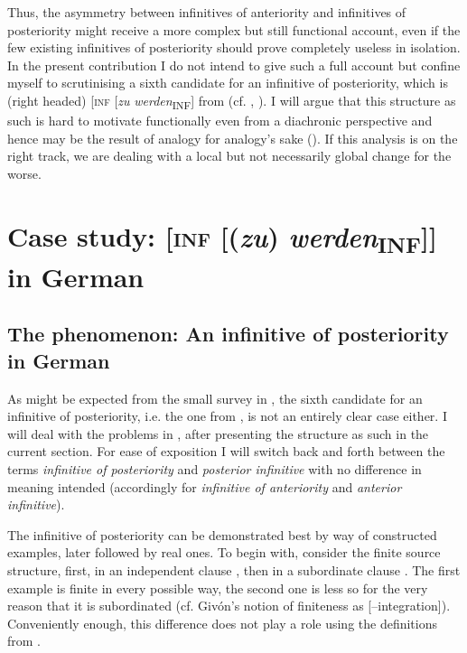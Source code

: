 \documentclass[output=paper,hidelinks]{langscibook}
\begin{document}
Thus, the asymmetry between infinitives of anteriority and infinitives of posteriority might receive a more complex but still functional account, even if the few existing infinitives of posteriority should prove completely useless in isolation. In the present contribution I do not intend to give such a full account but confine myself to scrutinising a sixth candidate for an infinitive of posteriority, which is (right headed) [\textsc{inf} [\emph{zu} \textit{werden}\textsubscript{INF}] from  (cf. , ). I will argue that this structure as such is hard to motivate functionally even from a diachronic perspective and hence may be the result of analogy for analogy’s sake (). If this analysis is on the right track, we are dealing with a local but not necessarily global change for the worse.

\section{Case study: [\textsc{inf} [(\emph{zu}) \textit{werden}\textsubscript{INF}]] in German}\label{sec:reiner:2}

\subsection{The phenomenon: An infinitive of posteriority in German}\label{sec:reiner:2.1}\largerpage[2]

As might be expected from the small survey in , the sixth candidate for an infinitive of posteriority, i.e. the one from , is not an entirely clear case either. I will deal with the problems in , after presenting the structure as such in the current section. For ease of exposition I will switch back and forth between the terms \emph{infinitive of posteriority} and \emph{posterior infinitive} with no difference in meaning intended (accordingly for \emph{infinitive of anteriority} and \emph{anterior infinitive}).

The  infinitive of posteriority can be demonstrated best by way of constructed examples, later followed by real ones. To begin with, consider the finite source structure, first, in an independent clause , then in a subordinate clause . The first example is finite in every possible way, the second one is less so for the very reason that it is subordinated (cf. Givón's \citeyear{Givón1990} notion of finiteness as [–integration]). Conveniently enough, this difference does not play a role using the definitions from .
\end{document}
